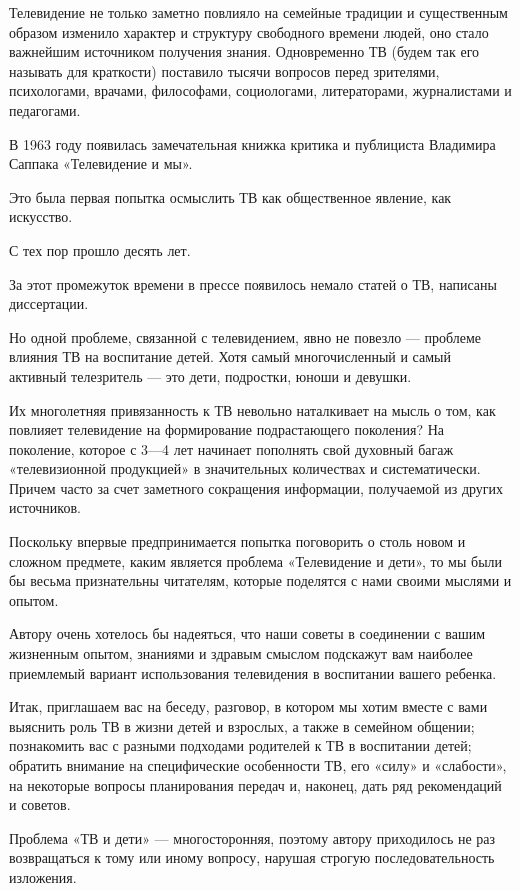 \documentclass[12pt, a4paper, openany]{book}
\begin{document}
Телевидение не только заметно повлияло на семейные традиции и существенным образом изменило характер и структуру свободного времени людей, оно стало важнейшим источником получения знания. Одновременно ТВ (будем так его называть для краткости) поставило тысячи вопросов перед зрителями, психологами, врачами, философами, социологами, литераторами, журналистами и педагогами. 

В 1963 году появилась замечательная книжка критика и публициста Владимира Саппака «Телевидение и мы». 

Это была первая попытка осмыслить ТВ как общественное явление, как искусство. 

С тех пор прошло десять лет. 

За этот промежуток времени в прессе появилось немало статей о ТВ, написаны диссертации. 

Но одной проблеме, связанной с телевидением, явно не повезло — проблеме влияния ТВ на воспитание детей. Хотя самый многочисленный и самый активный телезритель — это дети, подростки, юноши и девушки. 

Их многолетняя привязанность к ТВ невольно наталкивает на мысль о том, как повлияет телевидение на формирование подрастающего поколения? На поколение, которое с 3—4 лет начинает пополнять свой духовный багаж «телевизионной продукцией» в значительных количествах и систематически. Причем часто за счет заметного сокращения информации, получаемой из других источников. 

Поскольку впервые предпринимается попытка поговорить о столь новом и сложном предмете, каким является проблема «Телевидение и дети», то мы были бы весьма признательны читателям, которые поделятся с нами своими мыслями и опытом. 

Автору очень хотелось бы надеяться, что наши советы в соединении с вашим жизненным опытом, знаниями и здравым смыслом подскажут вам наиболее приемлемый вариант использования телевидения в воспитании вашего ребенка. 

Итак, приглашаем вас на беседу, разговор, в котором мы хотим вместе с вами выяснить роль ТВ в жизни детей и взрослых, а также в семейном общении; познакомить вас с разными подходами родителей к ТВ в воспитании детей; обратить внимание на специфические особенности ТВ, его «силу» и «слабости», на некоторые вопросы планирования передач и, наконец, дать ряд рекомендаций и советов. 

Проблема «ТВ и дети» — многосторонняя, поэтому автору приходилось не раз возвращаться к тому или иному вопросу, нарушая строгую последовательность изложения. 
\end{document}
